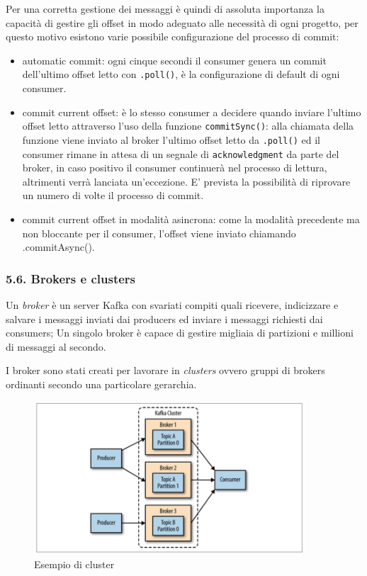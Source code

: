 \documentclass[]{article}
\providecommand{\tightlist}{%
  \setlength{\itemsep}{0pt}\setlength{\parskip}{0pt}}
\begin{document}
Per una corretta gestione dei messaggi è quindi di assoluta importanza
la capacità di gestire gli offset in modo adeguato alle necessità di
ogni progetto, per questo motivo esistono varie possibile configurazione
del processo di commit:

\begin{itemize}
\tightlist
\item
  automatic commit: ogni cinque secondi il consumer genera un commit
  dell'ultimo offset letto con \texttt{.poll()}, è la configurazione di
  default di ogni consumer.
\item
  commit current offset: è lo stesso consumer a decidere quando inviare
  l'ultimo offset letto attraverso l'uso della funzione
  \texttt{commitSync()}: alla chiamata della funzione viene inviato al
  broker l'ultimo offset letto da \texttt{.poll()} ed il consumer rimane
  in attesa di un segnale di \texttt{acknowledgment} da parte del
  broker, in caso positivo il consumer continuerà nel processo di
  lettura, altrimenti verrà lanciata un'eccezione. E' prevista la
  possibilità di riprovare un numero di volte il processo di commit.
\item
  commit current offset in modalità asincrona: come la modalità
  precedente ma non bloccante per il consumer, l'offset viene inviato
  chiamando .commitAsync().
\end{itemize}

\subsubsection{5.6. Brokers e clusters}\label{brokers-e-clusters}

Un \emph{broker} è un server Kafka con svariati compiti quali ricevere,
indicizzare e salvare i messaggi inviati dai producers ed inviare i
messaggi richiesti dai consumers; Un singolo broker è capace di gestire
migliaia di partizioni e millioni di messaggi al secondo.

I broker sono stati creati per lavorare in \emph{clusters} ovvero gruppi
di brokers ordinanti secondo una particolare gerarchia.

\begin{figure}
\centering
\includegraphics[width=0.90000\textwidth]{../images/kafka-cluster.png}
\caption{Esempio di cluster \label{figure_5}}
\end{figure}
\end{document}
